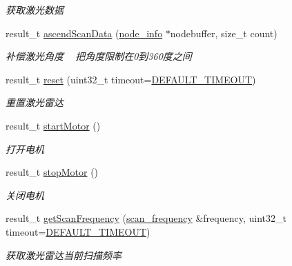 \begin{DoxyCompactItemize}
\begin{DoxyCompactList}\small\item\em 获取激光数据 ~\newline
\end{DoxyCompactList}\item 
result\+\_\+t \hyperlink{classydlidar_1_1_y_dlidar_driver_a6494501f3fee2f6dc410f869bbc18cb9}{ascend\+Scan\+Data} (\hyperlink{structnode__info}{node\+\_\+info} $\ast$nodebuffer, size\+\_\+t count)
\begin{DoxyCompactList}\small\item\em 补偿激光角度 ~\newline
把角度限制在0到360度之间 \end{DoxyCompactList}\item 
result\+\_\+t \hyperlink{classydlidar_1_1_y_dlidar_driver_a3dd4086c5685163f7c7487ea0f5af08c}{reset} (uint32\+\_\+t timeout=\hyperlink{classydlidar_1_1_y_dlidar_driver_a13a4f2dc4067b43794b2c47c06d5d27aa07c79ce96f468ff4b40495ef84584442}{D\+E\+F\+A\+U\+L\+T\+\_\+\+T\+I\+M\+E\+O\+UT})
\begin{DoxyCompactList}\small\item\em 重置激光雷达 ~\newline
\end{DoxyCompactList}\item 
result\+\_\+t \hyperlink{classydlidar_1_1_y_dlidar_driver_a2e686ef1ce60f3241352a798330f760b}{start\+Motor} ()
\begin{DoxyCompactList}\small\item\em 打开电机 ~\newline
\end{DoxyCompactList}\item 
result\+\_\+t \hyperlink{classydlidar_1_1_y_dlidar_driver_a6cdf0c5a7ddf2375c1392c3a0e65edfe}{stop\+Motor} ()
\begin{DoxyCompactList}\small\item\em 关闭电机 ~\newline
\end{DoxyCompactList}\item 
result\+\_\+t \hyperlink{classydlidar_1_1_y_dlidar_driver_a76efb701e137121b213f61028e3f235e}{get\+Scan\+Frequency} (\hyperlink{structscan__frequency}{scan\+\_\+frequency} \&frequency, uint32\+\_\+t timeout=\hyperlink{classydlidar_1_1_y_dlidar_driver_a13a4f2dc4067b43794b2c47c06d5d27aa07c79ce96f468ff4b40495ef84584442}{D\+E\+F\+A\+U\+L\+T\+\_\+\+T\+I\+M\+E\+O\+UT})
\begin{DoxyCompactList}\small\item\em 获取激光雷达当前扫描频率 ~\newline

\end{DoxyCompactList}
\end{DoxyCompactItemize}
